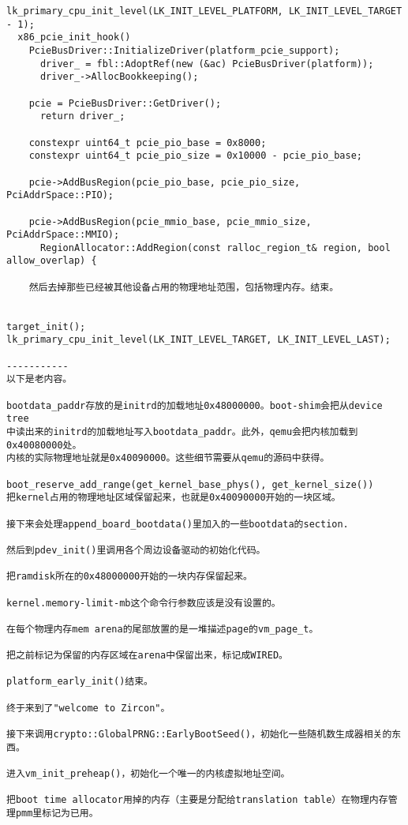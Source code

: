 \begin{verbatim}
lk_primary_cpu_init_level(LK_INIT_LEVEL_PLATFORM, LK_INIT_LEVEL_TARGET - 1);
  x86_pcie_init_hook()
    PcieBusDriver::InitializeDriver(platform_pcie_support);
      driver_ = fbl::AdoptRef(new (&ac) PcieBusDriver(platform));
      driver_->AllocBookkeeping();

    pcie = PcieBusDriver::GetDriver();
      return driver_;

    constexpr uint64_t pcie_pio_base = 0x8000;
    constexpr uint64_t pcie_pio_size = 0x10000 - pcie_pio_base;
  
    pcie->AddBusRegion(pcie_pio_base, pcie_pio_size, PciAddrSpace::PIO);

    pcie->AddBusRegion(pcie_mmio_base, pcie_mmio_size, PciAddrSpace::MMIO);
      RegionAllocator::AddRegion(const ralloc_region_t& region, bool allow_overlap) {

    然后去掉那些已经被其他设备占用的物理地址范围，包括物理内存。结束。


target_init();
lk_primary_cpu_init_level(LK_INIT_LEVEL_TARGET, LK_INIT_LEVEL_LAST);

-----------
以下是老内容。

bootdata_paddr存放的是initrd的加载地址0x48000000。boot-shim会把从device tree
中读出来的initrd的加载地址写入bootdata_paddr。此外，qemu会把内核加载到0x40080000处。
内核的实际物理地址就是0x40090000。这些细节需要从qemu的源码中获得。

boot_reserve_add_range(get_kernel_base_phys(), get_kernel_size())
把kernel占用的物理地址区域保留起来，也就是0x40090000开始的一块区域。

接下来会处理append_board_bootdata()里加入的一些bootdata的section.

然后到pdev_init()里调用各个周边设备驱动的初始化代码。

把ramdisk所在的0x48000000开始的一块内存保留起来。

kernel.memory-limit-mb这个命令行参数应该是没有设置的。

在每个物理内存mem arena的尾部放置的是一堆描述page的vm_page_t。

把之前标记为保留的内存区域在arena中保留出来，标记成WIRED。

platform_early_init()结束。

终于来到了"welcome to Zircon"。

接下来调用crypto::GlobalPRNG::EarlyBootSeed()，初始化一些随机数生成器相关的东西。

进入vm_init_preheap()，初始化一个唯一的内核虚拟地址空间。

把boot time allocator用掉的内存（主要是分配给translation table）在物理内存管理pmm里标记为已用。


\end{verbatim}
